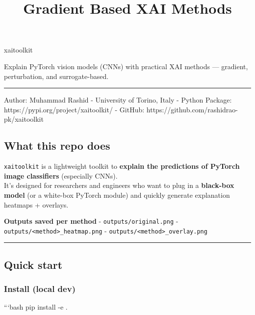 \documentclass[11pt]{article}
\title{Gradient Based XAI Methods}
\begin{document}
    
    \maketitle
    
    

    
    xaitoolkit

Explain PyTorch vision models (CNNs) with practical XAI methods ---
gradient, perturbation, and surrogate-based.

\begin{center}\rule{0.5\linewidth}{0.5pt}\end{center}

Author: Muhammad Rashid - University of Torino, Italy - Python Package:
https://pypi.org/project/xaitoolkit/ - GitHub:
https://github.com/rashidrao-pk/xaitoolkit

\subsection{What this repo does}\label{what-this-repo-does}

\texttt{xaitoolkit} is a lightweight toolkit to \textbf{explain the
predictions of PyTorch image classifiers} (especially CNNs).\\
It's designed for researchers and engineers who want to plug in a
\textbf{black-box model} (or a white-box PyTorch module) and quickly
generate explanation heatmaps + overlays.

\textbf{Outputs saved per method} - \texttt{outputs/original.png} -
\texttt{outputs/\textless{}method\textgreater{}\_heatmap.png} -
\texttt{outputs/\textless{}method\textgreater{}\_overlay.png}

\begin{center}\rule{0.5\linewidth}{0.5pt}\end{center}

\subsection{Quick start}\label{quick-start}

\subsubsection{Install (local dev)}\label{install-local-dev}

```bash pip install -e .
\end{document}
